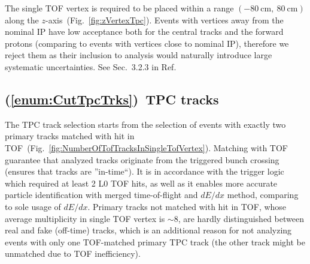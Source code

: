 The single TOF vertex is required to be placed within a range $(-80~\text{cm},~80~\text{cm})$ along the $z$-axis~(Fig.~\ref{fig:zVertexTpc}). Events with vertices away from the nominal IP have low acceptance both for the central tracks and the forward protons (comparing to events with vertices close to nominal IP), therefore we reject them as their inclusion to analysis would naturally introduce large systematic uncertainties. See Sec.~3.2.3 in Ref.~\cite{supplementaryNote}



















\subsection{(\ref{enum:CutTpcTrks})~TPC tracks}

The TPC track selection starts from the selection of events with exactly two primary tracks matched with hit in TOF~(Fig.~\ref{fig:NumberOfTofTracksInSingleTofVertex}). Matching with TOF guarantee that analyzed tracks originate from the triggered bunch crossing (ensures that tracks are ''in-time``). It is in accordance with the trigger logic which required at least 2 L0 TOF hits, as well as it enables more accurate particle identification with merged time-of-flight and $dE/dx$ method, comparing to sole usage of $dE/dx$. Primary tracks not matched with hit in TOF, whose average multiplicity in single TOF vertex is $\sim$8, are hardly distinguished between real and fake (off-time) tracks, which is an additional reason for not analyzing events with only one TOF-matched primary TPC track (the other track might be unmatched due to TOF inefficiency).


